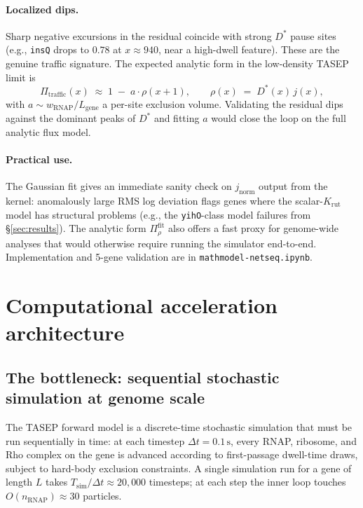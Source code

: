 \documentclass[11pt]{article}
\begin{document}
\paragraph{Localized dips.} Sharp negative excursions in the residual
coincide with strong $D^*$ pause sites (e.g., \texttt{insQ} drops to
$0.78$ at $x \approx 940$, near a high-dwell feature). These are the
genuine traffic signature. The expected analytic form in the
low-density TASEP limit is
\begin{equation}
  \Pi_{\text{traffic}}(x) \;\approx\; 1 \;-\; a \cdot \rho(x+1),
  \qquad \rho(x) \;=\; D^*(x)\, j(x),
  \label{eq:traffic}
\end{equation}
with $a \sim w_{\text{RNAP}} / L_{\text{gene}}$ a per-site exclusion
volume. Validating the residual dips against the dominant peaks of
$D^*$ and fitting $a$ would close the loop on the full analytic flux
model.

\paragraph{Practical use.} The Gaussian fit gives an immediate
sanity check on $j_{\text{norm}}$ output from the kernel: anomalously
large RMS log deviation flags genes where the scalar-$K_{\text{rut}}$
model has structural problems (e.g., the \texttt{yihO}-class
model failures from \S\ref{sec:results}). The analytic form
$\Pi_\rho^{\text{fit}}$ also offers a fast proxy for genome-wide
analyses that would otherwise require running the simulator end-to-end.
Implementation and 5-gene validation are in
\texttt{mathmodel-netseq.ipynb}.

\section{Computational acceleration architecture}
\label{sec:gpu}

\subsection{The bottleneck: sequential stochastic simulation at genome scale}

The TASEP forward model is a discrete-time stochastic simulation that must be
run sequentially in time: at each timestep $\Delta t = 0.1\,\text{s}$, every
RNAP, ribosome, and Rho complex on the gene is advanced according to
first-passage dwell-time draws, subject to hard-body exclusion constraints.
A single simulation run for a gene of length $L$ takes
$T_{\text{sim}}/\Delta t \approx 20{,}000$ timesteps; at each step the inner
loop touches $O(n_{\text{RNAP}}) \approx 30$ particles.
\end{document}
